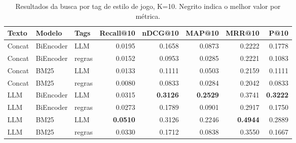 \begin{table}[h]
\centering
\caption{Resultados da busca por tag de estilo de jogo, K=10. Negrito indica o melhor valor por métrica.}
\label{tab:tag-search-k10}
\begin{tabular}{lllrrrrr}
\toprule
Texto & Modelo & Tags & Recall@10 & nDCG@10 & MAP@10 & MRR@10 & P@10 \\
\midrule
Concat & BiEncoder & LLM & 0.0195 & 0.1658 & 0.0873 & 0.2222 & 0.1778 \\
Concat & BiEncoder & regras & 0.0152 & 0.0953 & 0.0285 & 0.2221 & 0.1083 \\
Concat & BM25 & LLM & 0.0133 & 0.1111 & 0.0503 & 0.2159 & 0.1111 \\
Concat & BM25 & regras & 0.0080 & 0.0833 & 0.0284 & 0.2042 & 0.0833 \\
LLM & BiEncoder & LLM & 0.0315 & \textbf{0.3126} & \textbf{0.2529} & 0.3741 & \textbf{0.3222} \\
LLM & BiEncoder & regras & 0.0273 & 0.1789 & 0.0901 & 0.2917 & 0.1750 \\
LLM & BM25 & LLM & \textbf{0.0510} & 0.3126 & 0.2246 & \textbf{0.4944} & 0.2889 \\
LLM & BM25 & regras & 0.0330 & 0.1712 & 0.0838 & 0.3550 & 0.1667 \\
\bottomrule
\end{tabular}
\end{table}
